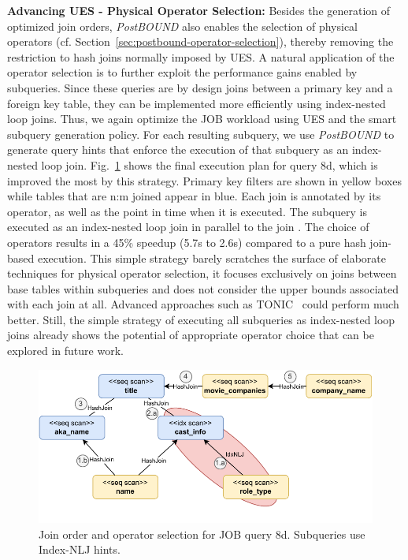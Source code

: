 \textbf{Advancing UES - Physical Operator Selection:}
Besides the generation of optimized join orders, \emph{PostBOUND} also enables the selection of physical operators (cf. Section~\ref{sec:postbound-operator-selection}), thereby removing the restriction to hash joins normally imposed by UES.
A natural application of the operator selection is to further exploit the performance gains enabled by subqueries.
Since these queries are by design joins between a primary key and a foreign key table, they can be implemented more efficiently using index-nested loop joins.
Thus, we again optimize the JOB workload using UES and the smart subquery generation policy.
For each resulting subquery, we use \emph{PostBOUND} to generate query hints that enforce the execution of that subquery as an index-nested loop join. Fig.~\ref{fig:idxnlj-results} shows the final execution plan for query 8d, which is improved the most by this strategy.
Primary key filters are shown in yellow boxes while tables that are n:m joined appear in blue.
Each join is annotated by its operator, as well as the point in time when it is executed.
The subquery  is executed as an index-nested loop join in parallel to the join .
The choice of operators results in a 45\% speedup (5.7s to 2.6s) compared to a pure hash join-based execution.
This simple strategy barely scratches the surface of elaborate techniques for physical operator selection, it focuses exclusively on joins between base tables within subqueries and does not consider the upper bounds associated with each join at all.
Advanced approaches such as TONIC~\cite{DBLP:journals/pvldb/HertzschuchHHL22} could perform much better.
Still, the simple strategy of executing all subqueries as index-nested loop joins already shows the potential of appropriate operator choice that can be explored in future work.

\begin{figure}[tb]
	\centering
	\includegraphics[width=0.95\linewidth]{figures/idxnlj-example-job-8d.pdf}
	\caption{Join order and operator selection for JOB query 8d. Subqueries use Index-NLJ hints.}
	\label{fig:idxnlj-results}
\end{figure}
